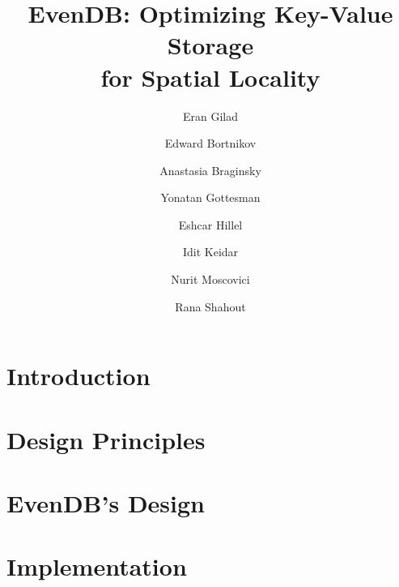 \documentclass[sigplan,10pt]{acmart}
\date{}
\newcommand{\sys}{EvenDB}
\begin{document}
\title[\sys: Key-Value Storage for Spatial Locality]{\sys: Optimizing Key-Value Storage\\ for Spatial Locality}

\author{Eran Gilad}

\author{Edward Bortnikov}

\author{Anastasia Braginsky}


\author{Yonatan Gottesman}


\author{Eshcar Hillel}

\author{Idit Keidar}

\author{Nurit Moscovici}

\author{Rana Shahout\footnotemark[1]}


\renewcommand{\shortauthors}{Eran Gilad et al.}

\begin{abstract}

\end{abstract}

\maketitle

\section{Introduction}
\label{sec:intro}


\section{Design Principles}
\label{sec:principles}

\section{\sys's Design}
\label{sec:design}


\section{Implementation}
\label{sec:impl}

\end{document}
